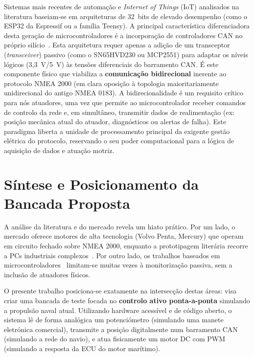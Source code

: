 Sistemas mais recentes de automação e \textit{Internet of Things} (IoT) analisados na literatura baseiam-se em arquiteturas de 32~bits de elevado desempenho (como o ESP32 da Espressif ou a família Teensy). A principal característica diferenciadora desta geração de microcontroladores é a incorporação de controladores CAN no próprio silício~\cite{espressif_twai}. Esta arquitetura requer apenas a adição de um transceptor (\textit{transceiver}) passivo (como o SN65HVD230 ou MCP2551) para adaptar os níveis lógicos (3,3~V/5~V) às tensões diferenciais do barramento CAN. É este componente físico que viabiliza a \textbf{comunicação bidirecional} inerente ao protocolo NMEA 2000 (em clara oposição à topologia maioritariamente unidirecional do antigo NMEA 0183). A bidirecionalidade é um requisito crítico para nós atuadores, uma vez que permite ao microcontrolador receber comandos de controlo da rede e, em simultâneo, transmitir dados de realimentação (ex: posição mecânica atual do atuador, diagnósticos ou alertas de falha). Este paradigma liberta a unidade de processamento principal da exigente gestão elétrica do protocolo, reservando o seu poder computacional para a lógica de aquisição de dados e atuação motriz.

\section{Síntese e Posicionamento da Bancada Proposta}
A análise da literatura e do mercado revela um hiato prático. Por um lado, o mercado oferece motores de alta tecnologia (Volvo Penta, Mercury) que operam em circuito fechado sobre NMEA 2000, enquanto a prototipagem literária recorre a PCs industriais complexos~\cite{ertogan2018marine}. Por outro lado, os trabalhos baseados em microcontroladores~\cite{park2011design,merazga2021nmea} limitam-se muitas vezes à monitorização passiva, sem a inclusão de atuadores físicos.

O presente trabalho posiciona-se exatamente na intersecção destas áreas: visa criar uma bancada de teste focada no \textbf{controlo ativo ponta-a-ponta} simulando a propulsão naval atual. Utilizando hardware acessível e de código aberto, o sistema lê de forma analógica um potenciómetro (simulando uma manete eletrónica comercial), transmite a posição digitalmente num barramento CAN (simulando a rede do navio), e atua fisicamente um motor DC com PWM (simulando a resposta da ECU do motor marítimo).

